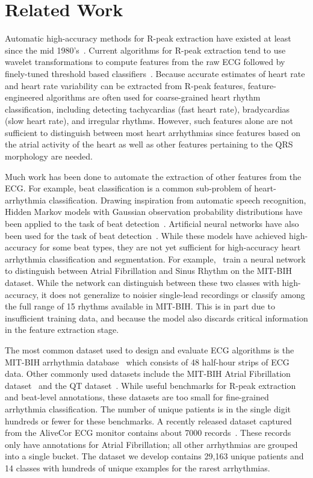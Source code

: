 \section{Related Work}
\label{sec:arrhythmias:related}

Automatic high-accuracy methods for R-peak extraction have existed at least
since the mid 1980's~\cite{pan1985real}. Current algorithms for R-peak
extraction tend to use wavelet transformations to compute features from the raw
ECG followed by finely-tuned threshold based classifiers~\cite{li1995detection,
martinez2004wavelet}. Because accurate estimates of heart rate and heart rate
variability can be extracted from R-peak features, feature-engineered
algorithms are often used for coarse-grained heart rhythm classification,
including detecting tachycardias (fast heart rate), bradycardias (slow heart
rate), and irregular rhythms. However, such features alone are not sufficient
to distinguish between most heart arrhythmias since features based on the
atrial activity of the heart as well as other features pertaining to the QRS
morphology are needed.

Much work has been done to automate the extraction of other features from the
ECG. For example, beat classification is a common sub-problem of
heart-arrhythmia classification. Drawing inspiration from automatic speech
recognition, Hidden Markov models with Gaussian observation probability
distributions have been applied to the task of beat
detection~\cite{coast1990approach}. Artificial neural networks have also been
used for the task of beat detection~\cite{melo2000arrhythmia}. While these
models have achieved high-accuracy for some beat types, they are not yet
sufficient for high-accuracy heart arrhythmia classification and segmentation.
For example,~\cite{artis1991detection} train a neural network to distinguish
between Atrial Fibrillation and Sinus Rhythm on the MIT-BIH dataset. While the
network can distinguish between these two classes with high-accuracy, it does
not generalize to noisier single-lead recordings or classify among the full
range of 15 rhythms available in MIT-BIH. This is in part due to insufficient
training data, and because the model also discards critical information in the
feature extraction stage.

The most common dataset used to design and evaluate ECG algorithms is the
MIT-BIH arrhythmia database~\cite{moody2001impact} which consists of 48
half-hour strips of ECG data. Other commonly used datasets include the MIT-BIH
Atrial Fibrillation dataset~\cite{moody1983new} and the QT
dataset~\cite{laguna1997database}. While useful benchmarks for R-peak
extraction and beat-level annotations, these datasets are too small for
fine-grained arrhythmia classification. The number of unique patients is in the
single digit hundreds or fewer for these benchmarks. A recently released
dataset captured from the AliveCor ECG monitor contains about 7000
records~\cite{clifford2017}.  These records only have annotations for Atrial
Fibrillation; all other arrhythmias are grouped into a single bucket. The
dataset we develop contains 29,163 unique patients and 14 classes with hundreds
of unique examples for the rarest arrhythmias.

